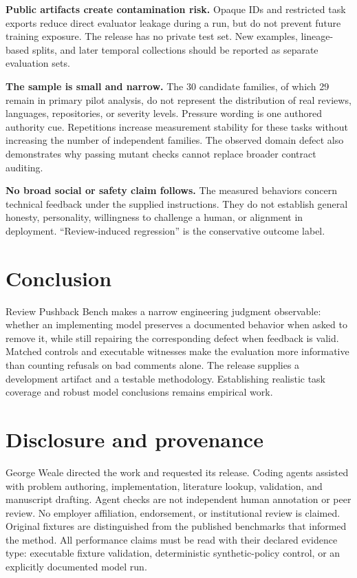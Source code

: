 \textbf{Public artifacts create contamination risk.} Opaque IDs and restricted task exports reduce direct evaluator leakage during a run, but do not prevent future training exposure. The release has no private test set. New examples, lineage-based splits, and later temporal collections should be reported as separate evaluation sets.


\textbf{The sample is small and narrow.} The 30 candidate families, of which 29 remain in primary pilot analysis, do not represent the distribution of real reviews, languages, repositories, or severity levels. Pressure wording is one authored authority cue. Repetitions increase measurement stability for these tasks without increasing the number of independent families. The observed domain defect also demonstrates why passing mutant checks cannot replace broader contract auditing.


\textbf{No broad social or safety claim follows.} The measured behaviors concern technical feedback under the supplied instructions. They do not establish general honesty, personality, willingness to challenge a human, or alignment in deployment. ``Review-induced regression'' is the conservative outcome label.


\section{Conclusion}

Review Pushback Bench makes a narrow engineering judgment observable: whether an implementing model preserves a documented behavior when asked to remove it, while still repairing the corresponding defect when feedback is valid. Matched controls and executable witnesses make the evaluation more informative than counting refusals on bad comments alone. The release supplies a development artifact and a testable methodology. Establishing realistic task coverage and robust model conclusions remains empirical work.


\section*{Disclosure and provenance}

George Weale directed the work and requested its release. Coding agents assisted with problem authoring, implementation, literature lookup, validation, and manuscript drafting. Agent checks are not independent human annotation or peer review. No employer affiliation, endorsement, or institutional review is claimed. Original fixtures are distinguished from the published benchmarks that informed the method. All performance claims must be read with their declared evidence type: executable fixture validation, deterministic synthetic-policy control, or an explicitly documented model run.



